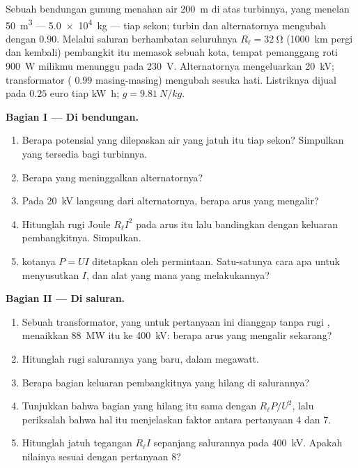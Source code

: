 \begin{problem}
\label{pb:g11:circuits-and-power:1}
Sebuah bendungan gunung menahan air \qty{200}{m} di atas turbinnya, yang
menelan \qty{50}{m^3} --- \qty{5.0e4}{kg} --- tiap sekon; turbin dan
alternatornya mengubah dengan  $0.90$. Melalui saluran
berhambatan seluruhnya $R_\ell = \qty{32}{\ohm}$ (\qty{1000}{km} pergi
dan kembali) pembangkit itu memasok sebuah kota, tempat pemanggang roti
\qty{900}{W} milikmu menunggu pada \qty{230}{V}. Alternatornya
mengeluarkan \qty{20}{kV}; transformator ( $0.99$ masing-masing)
mengubah  sesuka hati. Listriknya dijual pada $0.25$ euro
tiap \unit{kW.h}; $g = \qty{9.81}{N/kg}$.

\medskip
\noindent\textbf{Bagian I --- Di bendungan.}
\begin{enumerate}
  \item Berapa  potensial yang dilepaskan air yang jatuh itu tiap
        sekon? Simpulkan  yang tersedia bagi turbinnya.
  \item Berapa  yang meninggalkan alternatornya?
  \item Pada \qty{20}{kV} langsung dari alternatornya, berapa arus yang
        mengalir?
  \item Hitunglah rugi Joule $R_\ell I^2$ pada arus itu lalu bandingkan
        dengan keluaran pembangkitnya. Simpulkan.
  \item {} kotanya $P = UI$ ditetapkan oleh permintaan. Satu-satunya
        cara apa untuk menyusutkan $I$, dan alat yang mana yang
        melakukannya?
\end{enumerate}

\medskip
\noindent\textbf{Bagian II --- Di saluran.}
\begin{enumerate}[resume]
  \item Sebuah transformator, yang untuk pertanyaan ini dianggap tanpa
        rugi , menaikkan \qty{88}{MW} itu ke \qty{400}{kV}: berapa
        arus yang mengalir sekarang?
  \item Hitunglah rugi salurannya yang baru, dalam megawatt.
  \item Berapa bagian keluaran pembangkitnya yang hilang di salurannya?
  \item Tunjukkan bahwa bagian yang hilang itu sama dengan
        $R_\ell P/U^2$, lalu periksalah bahwa hal itu menjelaskan faktor
        antara pertanyaan 4 dan 7.
  \item Hitunglah jatuh tegangan $R_\ell I$ sepanjang salurannya pada
        \qty{400}{kV}. Apakah nilainya sesuai dengan pertanyaan 8?
\end{enumerate}


\end{problem}
